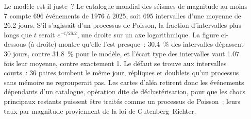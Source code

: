 Le modèle est-il juste~? Le catalogue mondial des séismes de magnitude au moins 7 compte 696 événements
de 1976 à 2025, soit 695 intervalles d'une moyenne de 26.2 jours. S'il s'agissait d'un processus de
Poisson, la fraction d'intervalles plus longs que $t$ serait $e^{-t/26.2}$, une droite sur un axe
logarithmique. La figure ci-dessous (à droite) montre qu'elle l'est presque~: \qty{30.4}{\percent}
des intervalles dépassent 30 jours, contre \qty{31.8}{\percent} pour le modèle, et l'écart type des
intervalles vaut 1.07 fois leur moyenne, contre exactement 1. Le défaut se trouve aux intervalles
courts~: 36 paires tombent le même jour, répliques et doublets qu'un processus sans mémoire ne
regrouperait pas. Les cartes d'aléa retirent donc les événements dépendants d'un catalogue, opération
dite de déclustérisation, pour que les chocs principaux restants puissent être traités comme
un processus de Poisson~; leurs taux par magnitude proviennent de la loi de Gutenberg--Richter.

